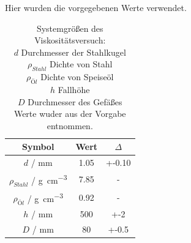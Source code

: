 \documentclass[11pt,ngerman]{scrartcl}
\begin{document}
%

Hier wurden die vorgegebenen Werte verwendet.

\begin{table}[H]
    \centering
    \caption{Systemgrößen des Viskositätsversuch:\\
    $d$ Durchmesser der Stahlkugel\\
    $\rho_{Stahl}$ Dichte von Stahl\\
    $\rho_{Öl}$   Dichte von Speiseöl\\
    $h$           Fallhöhe\\
    $D$          Durchmesser des Gefäßes\\ 
    Werte wuder aus der Vorgabe \cite{werteviskositat} entnommen.
}
    \label{tab:system_viskosität}
    \begin{tabular}{c|S|S}
        Symbol                                & {Wert} & {$\Delta$} \\ \hline
        $d$            / \si{\mm}             & 1.05       & +-0.10 \\
        $\rho_{Stahl}$ / \si{\g\per\cm\cubed} & 7.85       & { - } \\
        $\rho_{Öl}$    / \si{\g\per\cm\cubed} & 0.92       & { - } \\
        $h$            / \si{\mm}             & 500    & +-2\\
        $D$            / \si{\mm}             & 80     & +-0.5\\
    \end{tabular}
\end{table}
\end{document}
